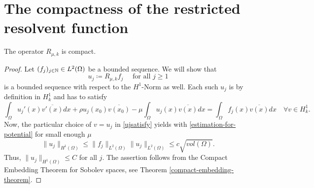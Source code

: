 \section{The compactness of the restricted resolvent function} \label{sec:4.2}

\begin{theorem} \label{3.1:thm-Rmuk.isCompact}
	The operator $R_{\mu, k}$ is compact.

	\begin{proof}
	Let $(f_{j})_{j \in \mathbb{N}} \in L^{2}(\Omega)$ be a  bounded sequence. We will show that 
		\[ u_{j} \coloneqq R_{\mu, k} f_{j} \quad \text{ for all } j \geq 1 \]
	is a bounded sequence with respect to the $H^{1}$-Norm as well. Each such $u_{j}$ is by definition in $H^{1}_{k}$ and has to satisfy
		\begin{equation}
			\int_{\Omega} u_{j}'(x) \overline{v'(x)} dx + \rho u_{j}(x_{0}) \overline{v(x_{0})} - \mu \int_{\Omega} u_{j}(x) \overline{v(x)} dx = \int_{\Omega} f_{j}(x) \overline{v(x)} dx \quad \forall v \in H^{1}_{k}. \label{ujsatisfy}
		\end{equation} 
	Now, the particular choice of $v = u_{j}$ in \eqref{ujsatisfy} yields with \eqref{estimation-for-potential} for small enough $\mu$
		\[  \| u_{j} \|_{H^{1}(\Omega)} \leq \| f_{j} \|_{L^{2}(\Omega)} \| u_{j} \|_{L^{2}(\Omega)} \leq c \sqrt{vol(\Omega)}. \]
	Thus, $\| u_{j} \|_{H^{1}(\Omega)} \leq C$ for all $j$. The assertion follows from the Compact Embedding Theorem for Sobolev spaces, see Theorem \ref{compact-embedding-theorem}.
	\end{proof}	
\end{theorem}		


